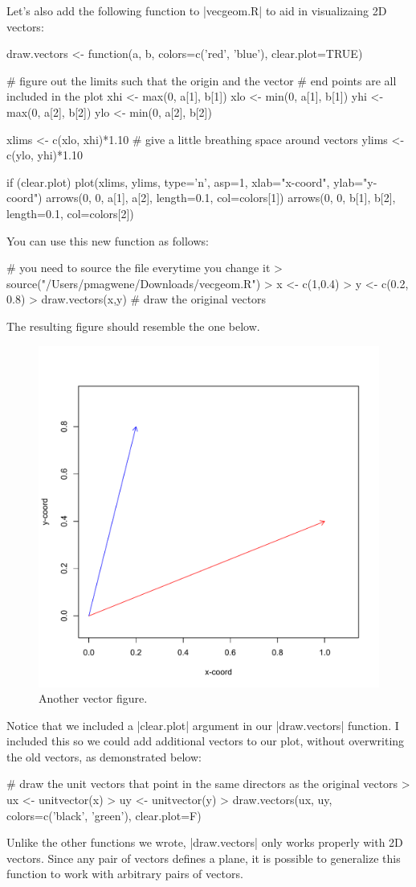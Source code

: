 Let's also add the following function to |vecgeom.R| to aid in visualizaing 2D vectors:
%
\begin{R}
draw.vectors <- function(a, b, colors=c('red', 'blue'), clear.plot=TRUE){

    # figure out the limits such that the origin and the vector
    # end points are all included in the plot
    xhi <- max(0, a[1], b[1])
    xlo <- min(0, a[1], b[1])
    yhi <- max(0, a[2], b[2])
    ylo <- min(0, a[2], b[2])

    xlims <- c(xlo, xhi)*1.10 # give a little breathing space around vectors
    ylims <- c(ylo, yhi)*1.10

    if (clear.plot){
        plot(xlims, ylims, type='n', asp=1, xlab="x-coord", ylab="y-coord")
    }
    arrows(0, 0, a[1], a[2], length=0.1, col=colors[1])
    arrows(0, 0, b[1], b[2], length=0.1, col=colors[2])
}
\end{R}
%
You can use this new function as follows:
\begin{R}
# you need to source the file everytime you change it
> source("/Users/pmagwene/Downloads/vecgeom.R")
> x <- c(1,0.4)
> y <- c(0.2, 0.8)
> draw.vectors(x,y)  # draw the original vectors
\end{R}
%
The resulting figure should resemble the one below.
%
\begin{figure}[htbp]
\centering
\includegraphics[width=0.33\columnwidth]{./figures/hands-on2/vecfig2.pdf}
\caption{Another vector figure.}
\end{figure}

Notice that we included a |clear.plot| argument in our |draw.vectors| function. I included this so we could add additional vectors to our plot, without overwriting the old vectors, as demonstrated below:
\begin{R}
# draw the unit vectors that point in the same directors as the original vectors
> ux <- unitvector(x)
> uy <- unitvector(y)
> draw.vectors(ux, uy, colors=c('black', 'green'), clear.plot=F)
\end{R}
%
Unlike the other functions we wrote, |draw.vectors| only works properly with 2D vectors. Since any pair of vectors defines a plane, it is possible to generalize this function to work with arbitrary pairs of vectors.


